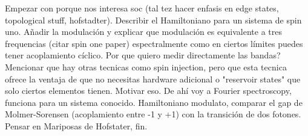 Empezar con porque nos interesa soc (tal tez hacer enfasis en edge states, topological stuff, hofstadter). Describir el Hamiltoniano para un sistema de spin uno. Añadir la modulación  y explicar que modulación es equivalente a tres frequencias (citar spin one paper) espectralmente como en ciertos límites puedes tener acoplamiento cíclico. Por que quiero medir directamente las bandas? Mencionar que hay otras tecnicas como spin injection, pero que esta tecnica ofrece la ventaja de que no necesitas hardware adicional o "reservoir states" que solo ciertos elementos tienen. Motivar eso. De ahí voy a Fourier spectroscopy, funciona para un sistema conocido. Hamiltoniano modulato, comparar el gap de Molmer-Sorensen (acoplamiento entre -1 y +1) con la transición de dos fotones. Pensar en Mariposas de Hofstater, fin. 









